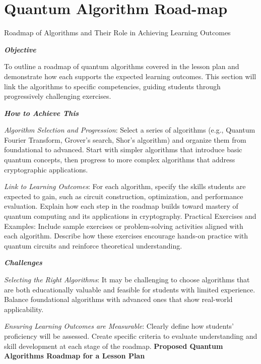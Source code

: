 \section{Quantum Algorithm Road-map}

Roadmap of Algorithms and Their Role in Achieving Learning Outcomes

\textbf{\emph{Objective}}

To outline a roadmap of quantum algorithms covered in the lesson plan and demonstrate how each supports the expected learning outcomes. This section will link the algorithms to specific competencies, guiding students through progressively challenging exercises.

\textbf{\emph{How to Achieve This}}

\emph{Algorithm Selection and Progression}: Select a series of algorithms (e.g., Quantum Fourier Transform, Grover’s search, Shor’s algorithm) and organize them from foundational to advanced. Start with simpler algorithms that introduce basic quantum concepts, then progress to more complex algorithms that address cryptographic applications.
      
\emph{Link to Learning Outcomes}: For each algorithm, specify the skills students are expected to gain, such as circuit construction, optimization, and performance evaluation. Explain how each step in the roadmap builds toward mastery of quantum computing and its applications in cryptography.
    Practical Exercises and Examples: Include sample exercises or problem-solving activities aligned with each algorithm. Describe how these exercises encourage hands-on practice with quantum circuits and reinforce theoretical understanding.

\textbf{\emph{Challenges}}

\emph{Selecting the Right Algorithms}: It may be challenging to choose algorithms that are both educationally valuable and feasible for students with limited experience. Balance foundational algorithms with advanced ones that show real-world applicability.

\emph{Ensuring Learning Outcomes are Measurable}: Clearly define how students’ proficiency will be assessed. Create specific criteria to evaluate understanding and skill development at each stage of the roadmap.
\textbf{Proposed Quantum Algorithms Roadmap for a Lesson Plan}

